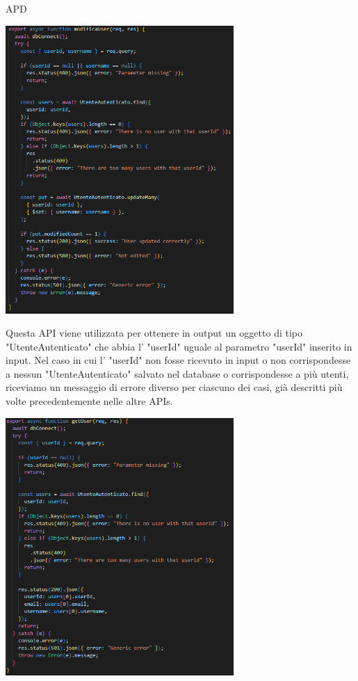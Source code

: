 \begin{listaPersonale} {APD}
\begin{listaPersonale2}[APD]{}
                \begin{center}
                    \includegraphics[width=0.65\textwidth, height=0.55\textheight]{img/png/APIs/modificaUser.png}
                \end{center}
                \newpage
                Questa API viene utilizzata per ottenere in output un oggetto di tipo "UtenteAutenticato" che abbia l' "userId" uguale al parametro "userId" inserito in input. Nel caso in cui l' "userId" non fosse ricevuto in input o non corrispondesse a nessun "UtenteAutenticato" salvato nel database o corrispondesse a più utenti, riceviamo un messaggio di errore diverso per ciascuno dei casi, già descritti più volte precedentemente nelle altre APIs.
                \begin{center}
                    \includegraphics[width=0.65\textwidth, height=0.55\textheight]{img/png/APIs/getUser_userId.png}

\end{center}
\end{listaPersonale2}
\end{listaPersonale}

